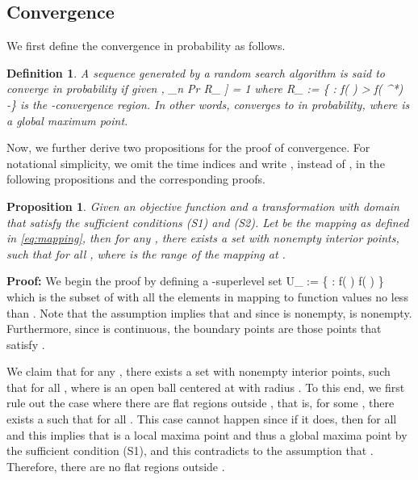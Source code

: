 \documentclass{article}
\newtheorem{defn}{Definition}
\newtheorem{prop}{Proposition}
\newcommand{\beq}{}
\newcommand{\pf}{{\bf Proof: }}
\newcommand{\Reps}{ R_{\epsilon} }
\newcommand{\pr}{ \textrm{Pr} }
\newcommand{\thetabm}{ {\boldsymbol{\theta}} }
\newcommand{\psibm}{ {\boldsymbol{\psi}} }
\begin{document}
\subsection{Convergence}
We first define the convergence in probability as follows.
\vspace{-0.10cm}
\begin{defn}
A sequence  generated by a random search algorithm is said to converge in probability if given ,
\beq\nonumber
\lim_{n \rightarrow \infty} \pr\left[ \thetabm[n] \in \Reps \right] = 1
\eeq
where
\beq\nonumber\label{eq:def_Reps}
\Reps := \left\{ \thetabm \in \Theta : f(\thetabm) > f\left(\thetabm^{*}\right) -\epsilon \right\}
\eeq
is the -convergence region. In other words,  converges to  in probability, where  is a global maximum point.
\end{defn}


Now, we further derive two propositions for the proof of convergence. For notational simplicity, we omit the time indices and write ,  instead of ,  in the following propositions and the corresponding proofs.

\vspace{-0.10cm}
\begin{prop} \label{prop:1}
Given an objective function  and a transformation  with domain  that satisfy the sufficient conditions (S1) and (S2). Let  be the mapping as defined in \eqref{eq:mapping}, then for any , there exists a set  with nonempty interior points, such that  for all , where  is the range of the mapping  at .
\end{prop}

\vspace{-0.10cm}
\pf We begin the proof by defining a -superlevel set
\beq \nonumber
U_\thetabm := \left \{ \psibm \in \Theta : f(\psibm) \geq f(\thetabm) \right \}
\eeq
which is the subset of  with all the elements in  mapping to function values no less than . Note that the assumption  implies that  and since  is nonempty,  is nonempty. Furthermore, since  is continuous, the boundary points are those points that satisfy .

We claim that for any , there exists a set  with nonempty interior points, such that  for all , where  is an open ball centered at  with radius . 
To this end, we first rule out the case where there are flat regions outside , that is, for some , there exists a  such that  for all . This case cannot happen since if it does, then  for all  and this implies that  is a local maxima point and thus a global maxima point by the sufficient condition (S1), and this contradicts to the assumption that . Therefore, there are no flat regions outside .
\end{document}
